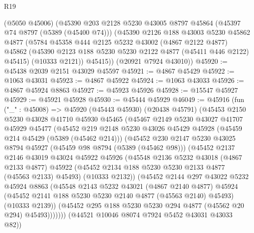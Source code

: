 \begin{lexlean}{R19}
\begin{coremodule}
      (@5050 @45006)
      (@45390
        @203
        @2128
        @5230
        @43005
        @8797
        @45864
        (@45397 @74 @8797 (@5389 (@45400 @74)))
        (@45390
          @2126
          @188
          @43003
          @5230
          @45862
          @4877
          (@5784
            @45358
            @444
            @2125
            @5232
            @43002
            (@4867 @2122 @4877)
            @45862
            (@45390 @2123 @188 @5230 @5230 @2122 @4877 (@45411 @446 @2122) @45415)
            (@10333 @2121))
          @45415))
      (@20921 @7924 @43010))
@45920 := @45438 @2039 @2151 @43029 @45597
@45921 := @4867 @45429
@45922 := @1063 @43031
@45923 := @4867 @45922
@45924 := @1063 @43033
@45926 := @4867 @45924 @8863
@45927 := @45923 @45926
@45928 := @15547 @45927
@45929 := @45921 @45928
@45930 := @45444 @45929
@46049 := @45916
    (fun ("_" : @45008) =>
    @45920
      (@45443 @45930)
      (@20438 @45791)
      (@45453
        @2150
        @5230
        @43028
        @41710
        @45930
        @45465
        (@45467
          @2149
          @5230
          @43027
          @41707
          @45929
          @45477
          (@45452
            @219
            @2148
            @5230
            @43026
            @45429
            @45928
            (@45459 @214 @45429 (@5389 (@45462 @214)))
            (@45452
              @230
              @2147
              @5230
              @43025
              @8794
              @45927
              (@45459 @98 @8794 (@5389 (@45462 @98)))
              (@45452
                @2137
                @2146
                @43019
                @43024
                @45922
                @45926
                (@45548
                  @2136
                  @5232
                  @43018
                  (@4867 @2133 @4877)
                  @45922
                  (@45452 @2134 @188 @5230 @5230 @2133 @4877 (@45563 @2133) @45493)
                  (@10333 @2132))
                (@45452
                  @2144
                  @297
                  @43022
                  @5232
                  @45924
                  @8863
                  (@45548
                    @2143
                    @5232
                    @43021
                    (@4867 @2140 @4877)
                    @45924
                    (@45452 @2141 @188 @5230 @5230 @2140 @4877 (@45563 @2140) @45493)
                    (@10333 @2139))
                  (@45452 @295 @188 @5230 @5230 @294 @4877 (@45562 @20 @294) @45493)))))))
      (@44521 @10046 @8074 @7924 @5452 @43031 @43033 @82))

\end{coremodule}
\end{lexlean}
